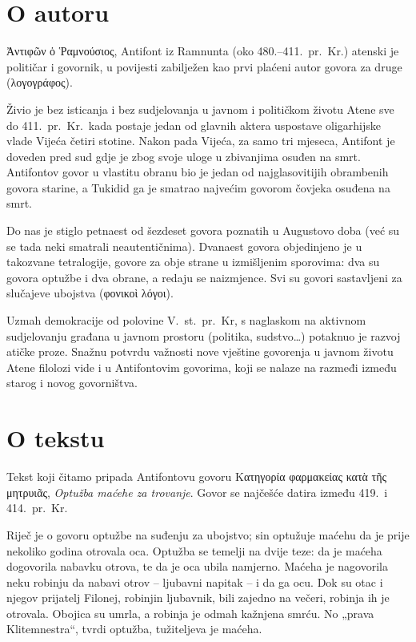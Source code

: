 \section*{O autoru}

\textgreek[variant=ancient]{Ἀντιφῶν ὁ Ῥαμνούσιος,} Antifont iz Ramnunta (oko 480.–411.\ pr.~Kr.) atenski je političar i govornik, u povijesti zabilježen kao prvi plaćeni autor govora za druge \textgreek[variant=ancient]{(λογογράφος).}
 
Živio je bez isticanja i bez sudjelovanja u javnom i političkom životu Atene sve do 411.\ pr.~Kr.\ kada postaje jedan od glavnih aktera uspostave oligarhijske vlade Vijeća četiri stotine. Nakon pada Vijeća, za samo tri mjeseca, Antifont je doveden pred sud gdje je zbog svoje uloge u zbivanjima osuđen na smrt. Antifontov govor u vlastitu obranu bio je jedan od najglasovitijih obrambenih govora starine, a Tukidid ga je smatrao najvećim govorom čovjeka osuđena na smrt.

Do nas je stiglo petnaest od šezdeset govora poznatih u Augustovo doba (već su se tada neki smatrali neautentičnima). Dvanaest govora objedinjeno je u takozvane tetralogije, govore za obje strane u izmišljenim sporovima: dva su govora optužbe i dva obrane, a redaju se naizmjence. Svi su govori sastavljeni za slučajeve ubojstva \textgreek[variant=ancient]{(φονικοὶ λόγοι).}

Uzmah demokracije od polovine V.~st.\ pr.~Kr, s naglaskom na aktivnom sudjelovanju građana u javnom prostoru (politika, sudstvo\dots) potaknuo je razvoj atičke proze. Snažnu potvrdu važnosti nove vještine govorenja u javnom životu Atene filolozi vide i u Antifontovim govorima, koji se nalaze na razmeđi između starog i novog govorništva.

\section*{O tekstu}

Tekst koji čitamo pripada Antifontovu govoru \textgreek[variant=ancient]{Κατηγορία φαρμακείας κατὰ τῆς μητρυιᾶς}, \textit{Optužba maćehe za trovanje}. Govor se najčešće datira između 419.\ i 414.\ pr.~Kr.

Riječ je o govoru optužbe na suđenju za ubojstvo; sin optužuje maćehu da je prije nekoliko godina otrovala oca. Optužba se temelji na dvije teze: da je maćeha dogovorila nabavku otrova, te da je oca ubila namjerno. Maćeha je nagovorila neku robinju da nabavi otrov – ljubavni napitak – i da ga ocu. Dok su otac i njegov  prijatelj Filonej, robinjin ljubavnik, bili zajedno na večeri, robinja ih je otrovala. Obojica su umrla, a robinja je odmah kažnjena smrću. No „prava Klitemnestra“, tvrdi optužba, tužiteljeva je maćeha.

